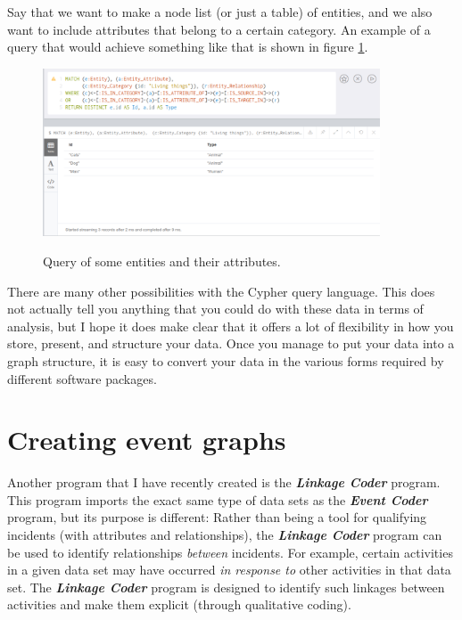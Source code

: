 \documentclass{memoir}
\begin{document}
Say that we want to make a node list (or just a table) of entities, and we also want to include attributes that belong to a certain category. An example of a query that would achieve something like that is shown in figure \ref{fig:attributestable}.

\begin{figure}[h!]
  \centering
  \caption{Query of some entities and their attributes.}
  \includegraphics[width=100mm]{Screenshot_24.pdf}
  \label{fig:attributestable}
\end{figure}

There are many other possibilities with the Cypher query language. This does not actually tell you anything that you could do with these data in terms of analysis, but I hope it does make clear that it offers a lot of flexibility in how you store, present, and structure your data. Once you manage to put your data into a graph structure, it is easy to convert your data in the various forms required by different software packages.

\section{Creating event graphs}
\label{sec:creatingeventgraphs}

Another program that I have recently created is the \emph{\textbf{Linkage Coder}} program. This program imports the exact same type of data sets as the \emph{\textbf{Event Coder}} program, but its purpose is different: Rather than being a tool for qualifying incidents (with attributes and relationships), the \textbf{\emph{Linkage Coder}} program can be used to identify relationships \emph{between} incidents. For example, certain activities in a given data set may have occurred \emph{in response to} other activities in that data set. The \emph{\textbf{Linkage Coder}} program is designed to identify such linkages between activities and make them explicit (through qualitative coding).
\end{document}

